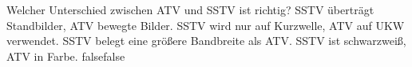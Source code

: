     {Welcher Unterschied zwischen ATV und SSTV ist richtig?}
    {SSTV überträgt Standbilder, ATV bewegte Bilder.}
    {SSTV wird nur auf Kurzwelle, ATV auf UKW verwendet.}
    {SSTV belegt eine größere Bandbreite als ATV.}
    {SSTV ist schwarzweiß, ATV in Farbe.}
    {false}{false}